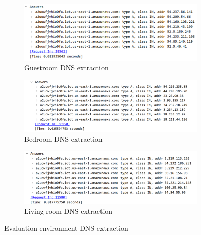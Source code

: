 \begin{figure}[H]
    \centering
    
    \begin{subfigure}{0.80\textwidth}
        \centering
        \includegraphics[width=\linewidth]{figures/Evaluation_dns_extraction 1.png}
        \caption{Guestroom DNS extraction}
        \label{fig:Evaluation_DNSextraction_1}
    \end{subfigure}
    \hfill
    \begin{subfigure}{0.80\textwidth}
        \centering
        \includegraphics[width=\linewidth]{figures/Evaluation_dns_extraction 2.png}
        \caption{Bedroom DNS extraction}
        \label{fig:Evaluation_DNSextraction_2}
    \end{subfigure}
    \hfill
    \begin{subfigure}{0.80\textwidth}
        \centering
        \includegraphics[width=\linewidth]{figures/Evaluation_dns_extraction 3.png}
        \caption{Living room DNS extraction}
        \label{fig:Evaluation_DNSextraction_3}
    \end{subfigure}
    
    \caption{Evaluation environment DNS extraction}
    \label{fig:Evaluation_DNSExtraction}
\end{figure}

